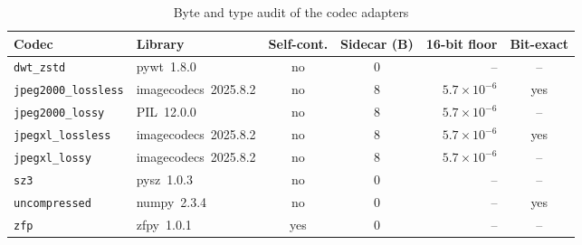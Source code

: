 \begin{table}[t]
\centering
\caption{Byte and type audit of the codec adapters}
\label{tab:byte_audit}
\footnotesize
\begin{tabular}{llccrc}
\toprule
Codec & Library & Self-cont. & Sidecar (B) & 16-bit floor & Bit-exact \\
\midrule
\texttt{dwt\_zstd} & pywt~1.8.0 & no & 0 & -- & -- \\
\texttt{jpeg2000\_lossless} & imagecodecs~2025.8.2 & no & 8 & $5.7\times10^{-6}$ & yes \\
\texttt{jpeg2000\_lossy} & PIL~12.0.0 & no & 8 & $5.7\times10^{-6}$ & -- \\
\texttt{jpegxl\_lossless} & imagecodecs~2025.8.2 & no & 8 & $5.7\times10^{-6}$ & yes \\
\texttt{jpegxl\_lossy} & imagecodecs~2025.8.2 & no & 8 & $5.7\times10^{-6}$ & -- \\
\texttt{sz3} & pysz~1.0.3 & no & 0 & -- & -- \\
\texttt{uncompressed} & numpy~2.3.4 & no & 0 & -- & yes \\
\texttt{zfp} & zfpy~1.0.1 & yes & 0 & -- & -- \\
\bottomrule
\end{tabular}

\end{table}
